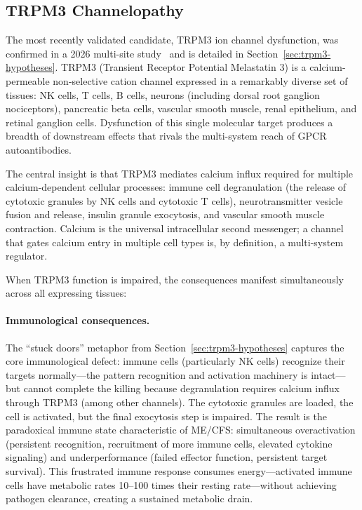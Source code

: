 \subsection{TRPM3 Channelopathy}
\label{sec:root-trpm3}

The most recently validated candidate, TRPM3 ion channel dysfunction, was confirmed in a 2026 multi-site study~\cite{Sasso2026trpm3} and is detailed in Section~\ref{sec:trpm3-hypotheses}. TRPM3 (Transient Receptor Potential Melastatin 3) is a calcium-permeable non-selective cation channel expressed in a remarkably diverse set of tissues: NK cells, T cells, B cells, neurons (including dorsal root ganglion nociceptors), pancreatic beta cells, vascular smooth muscle, renal epithelium, and retinal ganglion cells. Dysfunction of this single molecular target produces a breadth of downstream effects that rivals the multi-system reach of GPCR autoantibodies.

The central insight is that TRPM3 mediates calcium influx required for multiple calcium-dependent cellular processes: immune cell degranulation (the release of cytotoxic granules by NK cells and cytotoxic T cells), neurotransmitter vesicle fusion and release, insulin granule exocytosis, and vascular smooth muscle contraction. Calcium is the universal intracellular second messenger; a channel that gates calcium entry in multiple cell types is, by definition, a multi-system regulator.

When TRPM3 function is impaired, the consequences manifest simultaneously across all expressing tissues:

\paragraph{Immunological consequences.} The ``stuck doors'' metaphor from Section~\ref{sec:trpm3-hypotheses} captures the core immunological defect: immune cells (particularly NK cells) recognize their targets normally---the pattern recognition and activation machinery is intact---but cannot complete the killing because degranulation requires calcium influx through TRPM3 (among other channels). The cytotoxic granules are loaded, the cell is activated, but the final exocytosis step is impaired. The result is the paradoxical immune state characteristic of ME/CFS: simultaneous overactivation (persistent recognition, recruitment of more immune cells, elevated cytokine signaling) and underperformance (failed effector function, persistent target survival). This frustrated immune response consumes energy---activated immune cells have metabolic rates 10--100 times their resting rate---without achieving pathogen clearance, creating a sustained metabolic drain.

